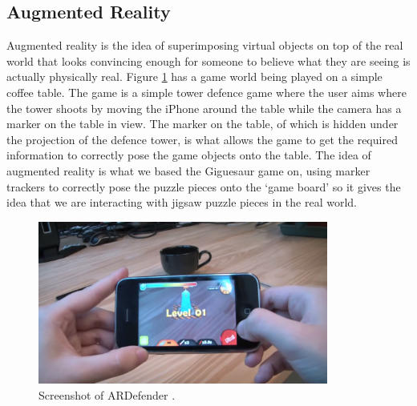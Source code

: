 \documentclass{article}
\begin{document}
\subsection{Augmented Reality}
Augmented reality is the idea of superimposing virtual objects on top of the
real world that looks convincing enough for someone to believe what they are
seeing is actually physically real. Figure \ref{fig:ARDefender} has a game
world being played on a simple coffee table. The game is a simple tower defence
game where the user aims where the tower shoots by moving the iPhone around the
table while the camera has a marker on the table in view. The marker on the
table, of which is hidden under the projection of the defence tower, is what
allows the game to get the required information to correctly pose the game
objects onto the table. The idea of augmented reality is what we based the
Giguesaur game on, using marker trackers to correctly pose the puzzle pieces
onto the `game board' so it gives the idea that we are interacting with jigsaw
puzzle pieces in the real world.

\begin{figure}[ht]
\begin{center}
\includegraphics[width=0.85\textwidth]{images/ARDefenderImage}
\caption{Screenshot of ARDefender \cite{img:ARDefender}.}
\label{fig:ARDefender}
\end{center}
\end{figure}

\end{document}
